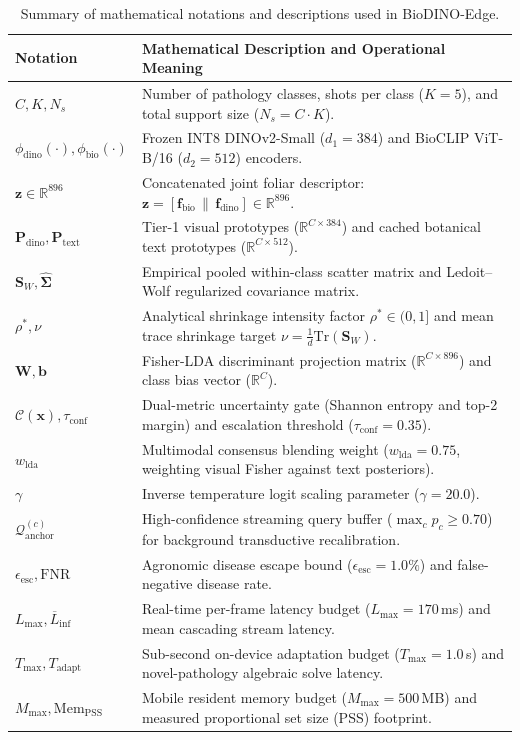 \documentclass[preprint,12pt]{elsarticle}
\begin{document}
\begin{table}[htbp]
\caption{Summary of mathematical notations and descriptions used in BioDINO-Edge.}
\label{tab:notation}
\centering
\footnotesize
\begin{tabularx}{\textwidth}{lX}
\toprule
\textbf{Notation} & \textbf{Mathematical Description and Operational Meaning} \\
\midrule
$C, K, N_s$ & Number of pathology classes, shots per class ($K=5$), and total support size ($N_s = C \cdot K$). \\
$\phi_{\text{dino}}(\cdot), \phi_{\text{bio}}(\cdot)$ & Frozen INT8 DINOv2-Small ($d_1 = 384$) and BioCLIP ViT-B/16 ($d_2 = 512$) encoders. \\
$\mathbf{z} \in \mathbb{R}^{896}$ & Concatenated joint foliar descriptor: $\mathbf{z} = [\mathbf{f}_{\text{bio}} \,\|\, \mathbf{f}_{\text{dino}}] \in \mathbb{R}^{896}$. \\
$\mathbf{P}_{\text{dino}}, \mathbf{P}_{\text{text}}$ & Tier-1 visual prototypes ($\mathbb{R}^{C \times 384}$) and cached botanical text prototypes ($\mathbb{R}^{C \times 512}$). \\
$\mathbf{S}_W, \hat{\mathbf{\Sigma}}$ & Empirical pooled within-class scatter matrix and Ledoit--Wolf regularized covariance matrix. \\
$\rho^*, \nu$ & Analytical shrinkage intensity factor $\rho^* \in (0, 1]$ and mean trace shrinkage target $\nu = \frac{1}{d}\text{Tr}(\mathbf{S}_W)$. \\
$\mathbf{W}, \mathbf{b}$ & Fisher-LDA discriminant projection matrix ($\mathbb{R}^{C \times 896}$) and class bias vector ($\mathbb{R}^C$). \\
$\mathcal{C}(\mathbf{x}), \tau_{\text{conf}}$ & Dual-metric uncertainty gate (Shannon entropy and top-2 margin) and escalation threshold ($\tau_{\text{conf}} = 0.35$). \\
$w_{\text{lda}}$ & Multimodal consensus blending weight ($w_{\text{lda}} = 0.75$, weighting visual Fisher against text posteriors). \\
$\gamma$ & Inverse temperature logit scaling parameter ($\gamma = 20.0$). \\
$\mathcal{Q}_{\text{anchor}}^{(c)}$ & High-confidence streaming query buffer ($\max_c p_c \ge 0.70$) for background transductive recalibration. \\
$\epsilon_{\text{esc}}, \text{FNR}$ & Agronomic disease escape bound ($\epsilon_{\text{esc}} = 1.0\%$) and false-negative disease rate. \\
$L_{\max}, \overline{L}_{\text{inf}}$ & Real-time per-frame latency budget ($L_{\max} = 170$\,ms) and mean cascading stream latency. \\
$T_{\max}, T_{\text{adapt}}$ & Sub-second on-device adaptation budget ($T_{\max} = 1.0$\,s) and novel-pathology algebraic solve latency. \\
$M_{\max}, \text{Mem}_{\text{PSS}}$ & Mobile resident memory budget ($M_{\max} = 500$\,MB) and measured proportional set size (PSS) footprint. \\
\bottomrule
\end{tabularx}
\end{table}
\end{document}
